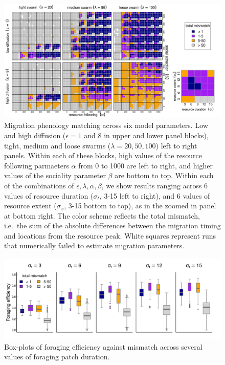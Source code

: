 \documentclass[12pt]{article}
\begin{document}
\begin{figure}
\includegraphics[width = \textwidth]{figures/StabilityResults.png} 
\caption{\label{fig_phenologymatching} Migration phenology matching across six model parameters. Low and high diffusion ($\epsilon = 1$ and $8$ in upper and lower panel blocks), tight, medium and loose swarms ($\lambda = 20, 50, 100$) left to right panels. Within each of these blocks, high values of the resource following parmaeters $\alpha$ from 0 to 1000 are left to right, and higher values of the sociality parameter $\beta$ are bottom to top. Within each of the combinations of $\epsilon, \lambda, \alpha, \beta$, we show results ranging across 6 values of resource duration ($\sigma_t$, 3-15 left to right), and 6 values of resource extent ($\sigma_x$, 3-15 bottom to top), as in the zoomed in panel at bottom right. The color scheme reflects the total mismatch, i.e.~the sum of the absolute differences between the migration timing and locations from the resource peak. White squares represent runs that numerically failed to estimate migration parameters.}
\end{figure}

\begin{figure}
\includegraphics[width = \textwidth]{figures/ForagingEfficiency.png}
\caption{\label{fig_boxplotFE} Box-plots of foraging efficiency against mismatch across several values of foraging patch duration.}
\end{figure}
\end{document}

